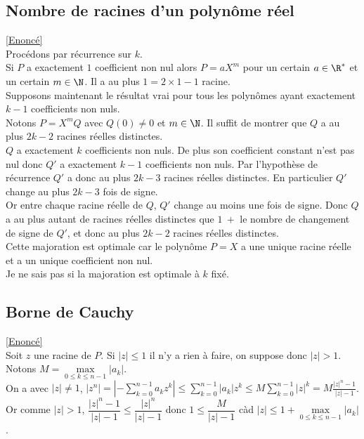 \documentclass{book}
\begin{document}
	\subsection{Nombre de racines d'un polynôme réel }
	\label{Nombre de racines d'un polynôme réel corrigé}
	\textcolor{blue}{\hyperref[Nombre de racines d'un polynôme réel]{[Enoncé]}}\\
	Procédons par récurrence sur $k$.\\
	Si $P$ a exactement $1$ coefficient non nul alors $P=aX^m$ pour un certain $a\in \R^*$ et un certain $m\in \N$. Il a au plus $1=2\times 1-1$ racine.\\
	Supposons maintenant le résultat vrai pour tous les polynômes ayant exactement $k-1$ coefficients non nuls.\\
	Notons $P=X^mQ$ avec $Q(0)\ne 0$ et $m\in \N$. Il suffit de montrer que $Q$ a au plus $2k-2$ racines réelles distinctes.\\
	$Q$ a exactement $k$ coefficients non nuls. De plus son coefficient constant n'est pas nul donc $Q'$ a exactement $k-1$ coefficients non nuls. Par l'hypothèse de récurrence $Q'$ a donc au plus $2k-3$ racines réelles distinctes. En particulier $Q'$ change au plus $2k-3$ fois de signe.\\
	Or entre chaque racine réelle de $Q$, $Q'$ change au moins une fois de signe. Donc $Q$ a au plus autant de racines réelles distinctes que $1\ +$ le nombre de changement de signe de $Q'$, et donc au plus $2k-2$ racines réelles distinctes.\\
	Cette majoration est optimale car le polynôme $P=X$ a une unique racine réelle et a un unique coefficient non nul.\\
	Je ne sais pas si la majoration est optimale à $k$ fixé.
	
	\subsection{Borne de Cauchy }
	\label{sec:borne-de-cauchy}
	\textcolor{blue}{\hyperref[Borne de Cauchy]{[Enoncé]}}\\
	Soit $z$ une racine de $P$. Si $|z|\leq 1$ il n'y a rien à faire, on suppose donc $|z|>1$. Notons $M=\max\limits_{0\leq k\leq n-1}|a_k|$.\\
	On a avec $|z|\ne 1$, $|z^n|=\displaystyle\left|-\sum_{k=0}^{n-1}a_kz^k\right|\leq \sum_{k=0}^{n-1}|a_k|z^k\leq M\sum_{k=0}^{n-1}|z|^k=M\frac{|z|^n-1}{|z|-1}$.\\
	Or comme $|z|>1$, $\dfrac{|z|^n-1}{|z|-1}\leq \dfrac{|z|^n}{|z|-1}$ donc $1\leq \dfrac{M}{|z|-1}$ càd $|z|\leq 1+\max\limits_{0\leq k\leq n-1}|a_k|$.
	
\end{document}
